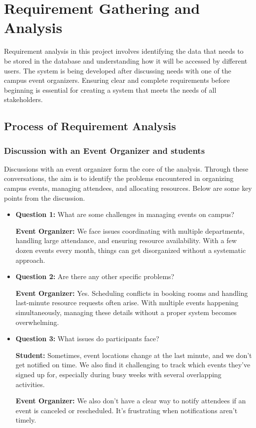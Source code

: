 \section{Requirement Gathering and Analysis}

Requirement analysis in this project involves identifying the data that needs to be stored in the database and understanding how it will be accessed by different users. The system is being developed after discussing needs with one of the campus event organizers. Ensuring clear and complete requirements before beginning is essential for creating a system that meets the needs of all stakeholders.

\subsection{Process of Requirement Analysis}

\subsubsection{Discussion with an Event Organizer and students}

Discussions with an event organizer form the core of the analysis. Through these conversations, the aim is to identify the problems encountered in organizing campus events, managing attendees, and allocating resources. Below are some key points from the discussion.

\begin{itemize}
    \item \textbf{Question 1:} What are some challenges in managing events on campus?
    
    \textbf{Event Organizer:} We face issues coordinating with multiple departments, handling large attendance, and ensuring resource availability. With a few dozen events every month, things can get disorganized without a systematic approach.
    
    \item \textbf{Question 2:} Are there any other specific problems?
    
    \textbf{Event Organizer:} Yes. Scheduling conflicts in booking rooms and handling last-minute resource requests often arise.
    With multiple events happening simultaneously, managing these details without a proper system becomes overwhelming.
    
    \item \textbf{Question 3:} What issues do participants face?

    \textbf{Student:} Sometimes, event locations change at the last minute, and we don't get notified on time. We also find it challenging to track which events they've signed up for, especially during busy weeks with several overlapping activities.

    \textbf{Event Organizer:} We also don't have a clear way to notify attendees if an event is canceled or rescheduled. It's frustrating when notifications aren't timely.
\end{itemize}

